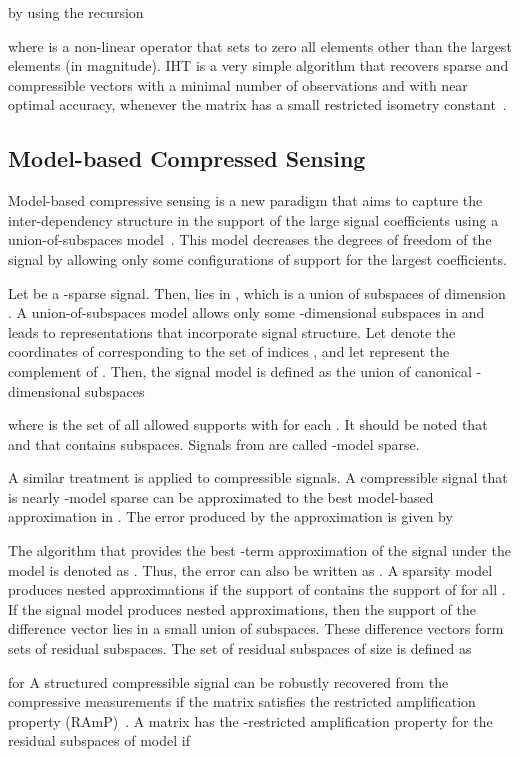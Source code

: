 \documentclass[journal]{IEEEtran}
\begin{document}
by using the recursion
 
where  is a non-linear operator that sets to zero all elements other than the  largest elements (in magnitude).
IHT is a very simple algorithm that recovers sparse and compressible vectors with a minimal number of observations and with near optimal accuracy, whenever the matrix  has a small restricted isometry constant~\cite{Blum09}.
 \subsection{Model-based Compressed Sensing}
Model-based compressive sensing is a new paradigm that aims to capture the inter-dependency structure in the support of the large signal coefficients using a union-of-subspaces model~\cite{Bara10}. This model decreases the degrees of freedom of the signal by allowing only some configurations of support for the largest coefficients.

Let  be a -sparse signal. Then,  lies in , which is a union of  subspaces of dimension . A union-of-subspaces model allows only some -dimensional subspaces in  and leads to representations that incorporate signal structure. Let  denote the coordinates of  corresponding to the set of indices , and let  represent the complement of . Then, the signal model  is defined as the union of  canonical -dimensional subspaces


where  is the set of all allowed supports with  for each . It should be noted that  and that  contains  subspaces. Signals from  are called -model sparse.

A similar treatment is applied to compressible signals. A compressible signal  that is nearly -model sparse can be approximated to the best model-based approximation in . The  error produced by the approximation is given by

The algorithm that provides the best -term approximation of the signal  under the model  is denoted as . Thus, the error  can also be written as .
A sparsity model  produces nested approximations if the support of  contains the support of  for all . If the signal model produces nested approximations, then the support of the difference vector  lies in a small union of subspaces. These difference vectors form sets of residual subspaces. The  set of residual subspaces of size  is defined as

for 
A structured compressible signal  can be robustly recovered from the compressive measurements  if the matrix  satisfies the restricted amplification property (RAmP)~\cite{Bara10}. A matrix  has the -restricted amplification property for the residual subspaces  of model  if
\end{document}
